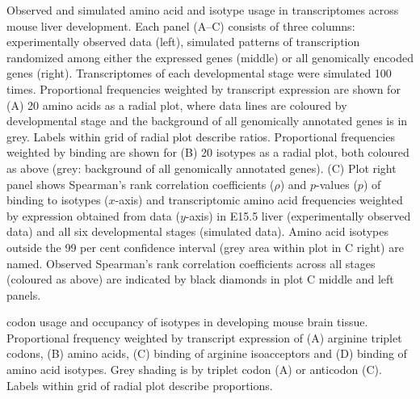 \thispagestyle{empty}
    {Observed and simulated amino acid and isotype usage in transcriptomes
    across mouse liver development.}
    {Each panel (A–C) consists of three columns: experimentally observed data
    (left), simulated patterns of transcription randomized among either the
    expressed genes (middle) or all genomically encoded genes (right).
    Transcriptomes of each developmental stage were simulated \num{100} times.
    Proportional frequencies weighted by transcript expression are shown for (A)
    \num{20} amino acids as a radial plot, where data lines are coloured by
    developmental stage and the background of all genomically annotated \mrna
    genes is in grey. Labels within grid of radial plot describe ratios.
    Proportional frequencies weighted by  binding are shown for (B)
    \num{20} isotypes as a radial plot, both coloured as above (grey: background
    of all genomically annotated \trna genes). (C) Plot right panel shows
    Spearman’s rank correlation coefficients (\(\rho\)) and \(p\)-values (\(p\))
    of  binding to \trna isotypes (\(x\)-axis) and transcriptomic amino
    acid frequencies weighted by expression obtained from \rnaseq data
    (\(y\)-axis) in E15.5 liver (experimentally observed data) and all six
    developmental stages (simulated data). Amino acid isotypes outside the
    \num{99} per cent confidence interval (grey area within plot in C right) are
    named. Observed Spearman’s rank correlation coefficients across all stages
    (coloured as above) are indicated by black diamonds in plot C middle and
    left panels.}

    {\mrna codon usage and  occupancy of \trna isotypes in developing mouse
    brain tissue.}
    {Proportional frequency weighted by transcript expression of (A) arginine
    triplet codons, (B) amino acids, (C)  binding of arginine isoacceptors
    and (D)  binding of amino acid isotypes. Grey shading is by triplet
    codon (A) or \trna anticodon (C). Labels within grid of radial plot describe
    proportions.}

